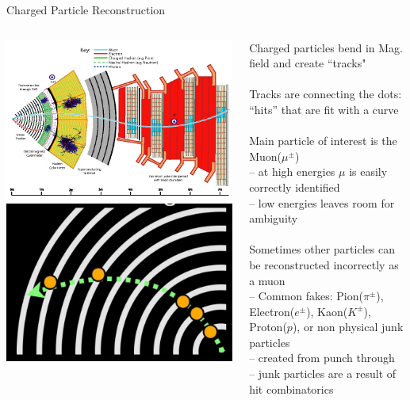 \documentclass[10pt,handout]{beamer}
\begin{document}
\begin{frame}{Charged Particle Reconstruction}
\begin{columns}
\begin{column}{0.5\textwidth}
\includegraphics[scale=0.2]{particles.png}\\
\includegraphics[scale=0.2]{trackreco.png}
\end{column}
\begin{column}{0.5\textwidth}
\small
Charged particles bend in Mag. field and create ``tracks"\\
\quad \quad \\
Tracks are connecting the dots: ``hits'' that are fit with a curve \\
\quad \quad \\
Main particle of interest is the Muon($\mu^\pm$)\\
\scriptsize
\quad	-- at high energies $\mu$ is easily correctly identified\\
\quad	-- low energies leaves room for ambiguity\\
\small
\quad \quad \\
Sometimes other particles can be reconstructed incorrectly as a muon\\
\scriptsize
\quad	-- Common fakes: Pion($\pi^\pm$), Electron($e^\pm$), Kaon($K^\pm$), Proton($p$), or non physical junk particles\\
\quad	-- created from punch through\\
\quad	-- junk particles are a result of hit combinatorics\\



\end{column}
\end{columns}
\end{frame}
\end{document}
